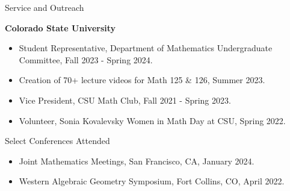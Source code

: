\documentclass[
	11pt, %
]{resume} %
\begin{document}

\begin{rSection}{Service and Outreach}

	\textbf{Colorado State University}
	\begin{itemize}
		\item{Student Representative, Department of Mathematics Undergraduate Committee, Fall 2023 - Spring 2024.}
		\item{Creation of 70+ lecture videos for Math 125 \& 126, Summer 2023.}
		\item{Vice President, CSU Math Club, Fall 2021 - Spring 2023.}
		\item{Volunteer, Sonia Kovalevsky Women in Math Day at CSU, Spring 2022.}
	\end{itemize}
	
\end{rSection}


\begin{rSection}{Select Conferences Attended}

	\begin{itemize}
		\item{Joint Mathematics Meetings, San Francisco, CA, January 2024.}
		\item{Western Algebraic Geometry Symposium, Fort Collins, CO, April 2022.}
	\end{itemize}
	
\end{rSection}





\fancyfoot{}
\end{document}
